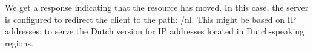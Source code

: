 We get a response indicating that the resource has moved. In this case, the server is configured to redirect the client to the path: /nl. This might be based on IP addresses; to serve the Dutch version for IP addresses located in Dutch-speaking regions.